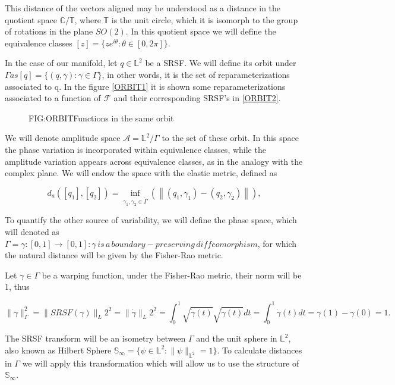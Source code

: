 This distance of the vectors aligned may be understood as a distance in the
quotient space $\mathbb{C} / \mathbb{T}$, where $\mathbb{T}$ is the unit circle,
which it is isomorph to the group of rotations in the plane $SO(2)$. In this
quotient space we will define the equivalence classes
$[z] = \{z e^{i \theta} : \theta \in [0, 2\pi]\}$.

In the case of our manifold, let $q \in \mathbb{L}^2$ be a SRSF. We will define
its orbit under $\Gamma as [q] = \{(q, \gamma) : \gamma \in \Gamma \}$, in
other words, it is the set of reparameterizations associated to q. In the
figure \ref{ORBIT1} it is shown some reparameterizations associated  to a function
of $\mathscr{F}$ and their corresponding SRSF's in \ref{ORBIT2}.


\begin{figure}[Functions in the same orbit]{FIG:ORBIT}{Functions in the same orbit}
   \quad
\end{figure}

We will denote amplitude space $\mathscr{A}= \mathbb{L}^{2} / \Gamma$  to the
set of these orbit. In this space the phase variation is incorporated within
equivalence classes, while the amplitude variation appears across equivalence
classes, as in the analogy with the complex plane. We will endow the space with
the elastic metric, defined as

$$
d_{a}\left(\left[q_{1}\right],\left[q_{2}\right]\right)=\inf _{
\gamma_{1}, \gamma_{2} \in \tilde{\Gamma}}\left(\left\|\left(q_{1},
 \gamma_{1}\right)-\left(q_{2}, \gamma_{2}\right)\right\|\right),
$$

To quantify the other source of variability, we will define the phase space,
which will denoted as
$\Gamma = {\gamma :[0,1] \rightarrow[0,1]  : \gamma \, is \, a \, boundary-preserving \, diffeomorphism}$,
for which the natural distance will be given by the Fisher-Rao metric.

Let $\gamma \in \Gamma$ be a warping function, under the Fisher-Rao metric,
their norm will be 1, thus

$$
\| \gamma \|_\Gamma^2 = \| SRSF(\gamma)\|_L2^2 =  \| \dot \gamma\|_L2^2 =
\int_0^1 \sqrt{\dot \gamma (t)} \sqrt{\dot \gamma (t)}dt =
\int_0^1 \dot \gamma(t)dt = \gamma(1) - \gamma(0) = 1.
$$

The SRSF transform will be an isometry between $\Gamma$ and the unit sphere in
$\mathbb{L}^2$, also known as Hilbert Sphere
$\mathbb{S}_\infty = \{ \psi \in \mathbb{L}^2 : \|\psi\|_{\mathbb{L}^2}=1\}$.
To calculate distances in $\Gamma$ we will apply this transformation which will
allow us to use the structure of $\mathbb{S}_\infty$.

